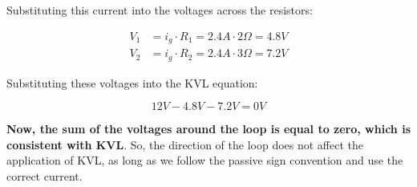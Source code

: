 Substituting this current into the voltages across the resistors:

\begin{align}
V_1 &= i_g \cdot R_1 = 2.4A \cdot 2\Omega = 4.8V \\
V_2 &= i_g \cdot R_2 = 2.4A \cdot 3\Omega = 7.2V
\end{align}

Substituting these voltages into the KVL equation:

\begin{equation}
12V - 4.8V - 7.2V = 0V
\end{equation}

\textbf{Now, the sum of the voltages around the loop is equal to zero, which is consistent with KVL}. So, the direction of the loop does not affect the application of KVL, as long as we follow the passive sign convention and use the correct current.


